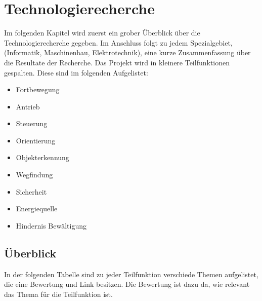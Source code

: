 \newpage
\section{Technologierecherche}

Im folgenden Kapitel wird zuerst ein grober Überblick über die Technologierecherche gegeben. Im Anschluss folgt zu jedem Spezialgebiet, (Informatik, Maschinenbau, Elektrotechnik), eine kurze Zusammenfassung über die Resultate der Recherche. Das Projekt wird in kleinere Teilfunktionen gespalten. Diese sind im folgenden Aufgelistet:
\begin{itemize}
    \item Fortbewegung
    \item Antrieb
    \item Steuerung
    \item Orientierung
    \item Objekterkennung
    \item Wegfindung
    \item Sicherheit
    \item Energiequelle
    \item Hindernis Bewältigung
\end{itemize}


\subsection{Überblick}
In der folgenden Tabelle sind zu jeder Teilfunktion verschiede Themen aufgelistet, die eine Bewertung und Link besitzen. Die Bewertung ist dazu da, wie relevant das Thema für die Teilfunktion ist.

